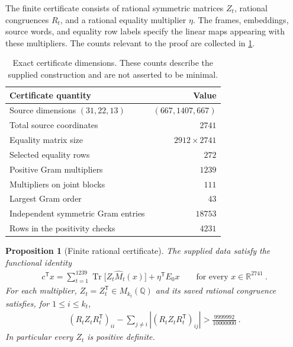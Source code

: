 \documentclass[aps,pra,reprint,superscriptaddress,amsmath,amssymb,floatfix,nofootinbib]{revtex4-2}
\newcommand{\Tr}{\operatorname{Tr}}
\newcommand{\R}{\mathbb R}
\newcommand{\Q}{\mathbb Q}
\newtheorem{proposition}[theorem]{Proposition}
\begin{document}
The finite certificate consists of rational symmetric matrices $Z_t$,
rational congruences $R_t$, and a rational equality multiplier $\eta$.
The frames, embeddings, source words, and equality row labels specify the
linear maps appearing with these multipliers.
The counts relevant to the proof are collected in \cref{tab:certificate}.

\begin{table}[ht]
\centering
\begin{tabular}{lr}
\toprule
Certificate quantity & Value\\
\midrule
Source dimensions $(31,22,13)$ & $(667,1407,667)$\\
Total source coordinates & $2741$\\
Equality matrix size & $2912\times2741$\\
Selected equality rows & $272$\\
Positive Gram multipliers & $1239$\\
Multipliers on joint blocks & $111$\\
Largest Gram order & $43$\\
Independent symmetric Gram entries & $18753$\\
Rows in the positivity checks & $4231$\\
\bottomrule
\end{tabular}
\caption{Exact certificate dimensions. These counts describe the supplied
construction and are not asserted to be minimal.}
\label{tab:certificate}
\end{table}

\begin{proposition}[Finite rational certificate]
\label{prop:certificate}
The supplied data satisfy the functional identity
\begin{align}
 c^{\mathsf T}x
 =\sum_{t=1}^{1239}\Tr\bigl[Z_t\widehat M_t(x)\bigr]
       +\eta^{\mathsf T}E_0x
 \qquad\text{for every }x\in\R^{2741}\ .
 \label{eq:exact-d4-three-certificate}
\end{align}
For each multiplier, $Z_t=Z_t^{\mathsf T}\in M_{k_t}(\Q)$ and its
saved rational congruence satisfies, for $1\leq i\leq k_t$,
\begin{align}
 (R_tZ_tR_t^{\mathsf T})_{ii}
 -\sum_{j\ne i}|(R_tZ_tR_t^{\mathsf T})_{ij}|
 >\frac{9999992}{10000000}\ .
 \label{eq:exact-congruence-positive}
\end{align}
In particular every $Z_t$ is positive definite.
\end{proposition}
\end{document}
